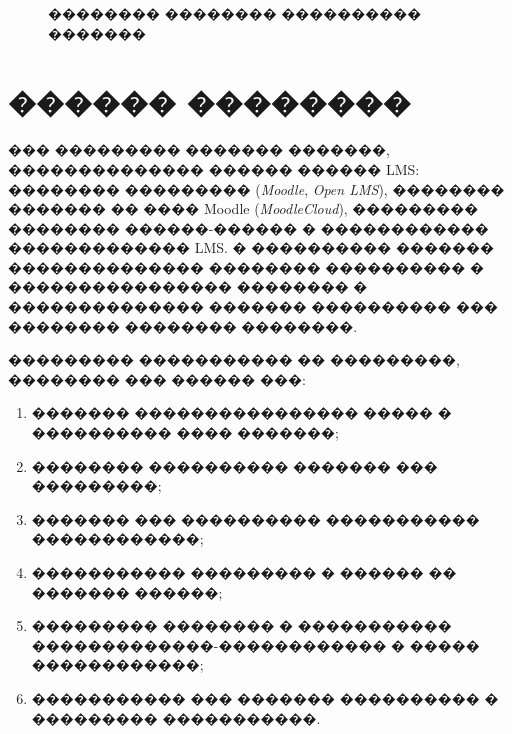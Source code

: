 \begin{figure}[H]
\centering
{}
\caption{�������� �������� ���������� �������}
\label{fig:analysis-req-hierarchy}
\end{figure}

\section{������ ��������}

��� ��������� ������� �������, �������������� ������ ������ LMS: �������� ��������� (\textit{Moodle}, \textit{Open LMS}), �������� ������� �� ���� Moodle (\textit{MoodleCloud}), ��������� �������� ������-������ � ������������ ������������� LMS\cite{moodle_lms,open_lms,moodlecloud,docebo_adaptive_2026}. � ���������� ������� �������������� �������� ���������� � ���������������� �������� � �������������� ������� ���������� ��� �������� �������� ��������\cite{educause_adaptive_2016,discovery_intelligent_adaptive}.

��������� ����������� �� ���������, �������� ��� ������ ���:
\begin{enumerate}
  \item ������� ���������������� ����� � ���������� ���� �������;
  \item �������� ���������� ������� ��� ���������;
  \item ������� ��� ���������� ����������� ������������;
  \item ����������� ��������� � ������ �� ������� ������;
  \item ��������� �������� � ����������� �������������-������������ � ����� ������������;
  \item ����������� ��� ������� ���������� � ��������� �����������.
\end{enumerate}

